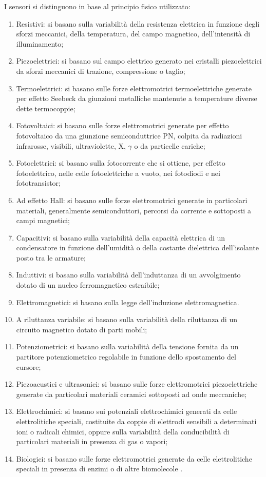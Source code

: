 \documentclass[a4paper]{report} %
\begin{document}
I sensori si distinguono in base al principio fisico utilizzato:
\begin{enumerate}
\item Resistivi: si basano sulla variabilità della resistenza elettrica in funzione degli sforzi meccanici, della temperatura, del campo magnetico, dell'intensità di illuminamento;
\item Piezoelettrici: si basano sul campo elettrico generato nei cristalli piezoelettrici da sforzi meccanici di trazione, compressione o taglio;
\item Termoelettrici: si basano sulle forze elettromotrici termoelettriche generate per effetto Seebeck da giunzioni metalliche mantenute a temperature diverse dette termocoppie;
\item Fotovoltaici: si basano sulle forze elettromotrici generate per effetto fotovoltaico da una giunzione semiconduttrice PN, colpita da radiazioni infrarosse, visibili, ultraviolette, X, $\gamma$ o da particelle cariche;
\item Fotoelettrici: si basano sulla fotocorrente che si ottiene, per effetto fotoelettrico, nelle celle fotoelettriche a vuoto, nei fotodiodi e nei fototransistor;
\item Ad effetto Hall: si basano sulle forze elettromotrici generate in particolari materiali, generalmente semiconduttori, percorsi da corrente e sottoposti a campi magnetici;
\item Capacitivi: si basano sulla variabilità della capacità elettrica di un condensatore in funzione dell'umidità o della costante dielettrica dell'isolante posto tra le armature;
\item Induttivi: si basano sulla variabilità dell'induttanza di un avvolgimento dotato di un nucleo ferromagnetico estraibile;
\item Elettromagnetici: si basano sulla legge dell'induzione elettromagnetica.
\item A riluttanza variabile: si basano sulla variabilità della riluttanza di un circuito magnetico dotato di parti mobili;
\item Potenziometrici: si basano sulla variabilità della tensione fornita da un partitore potenziometrico regolabile in funzione dello spostamento del cursore;
\item Piezoacustici e ultrasonici: si basano sulle forze elettromotrici piezoelettriche generate da particolari materiali ceramici sottoposti ad onde meccaniche;
\item Elettrochimici: si basano sui potenziali elettrochimici generati da celle elettrolitiche speciali, costituite da coppie di elettrodi sensibili a determinati ioni o radicali chimici, oppure sulla variabilità della conducibilità di particolari materiali in presenza di gas o vapori;
\item Biologici: si basano sulle forze elettromotrici generate da celle elettrolitiche speciali in presenza di enzimi o di altre biomolecole \cite{art:rif.1}.
\end{enumerate}
\end{document}
